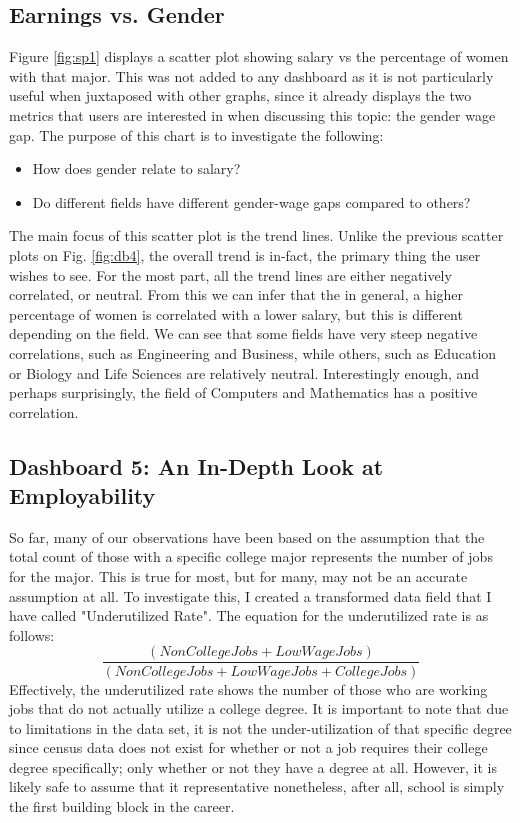 \documentclass[sigchi]{acmart}
\begin{document}
\subsection{Earnings vs. Gender}
\label{sec:earningsgender}

Figure \ref{fig:sp1} displays a scatter plot showing salary vs the percentage of women with that major. This was not added to any dashboard as it is not particularly useful when juxtaposed with other graphs, since it already displays the two metrics that users are interested in when discussing this topic: the gender wage gap. The purpose of this chart is to investigate the following:
\begin{itemize}
\item{How does gender relate to salary?}
\item{Do different fields have different gender-wage gaps compared to others?}
\end{itemize}
The main focus of this scatter plot is the trend lines. Unlike the previous scatter plots on Fig. \ref{fig:db4}, the overall trend is in-fact, the primary thing the user wishes to see. For the most part, all the trend lines are either negatively correlated, or neutral. From this we can infer that the in general, a higher percentage of women is correlated with a lower salary, but this is different depending on the field. We can see that some fields have very steep negative correlations, such as Engineering and Business, while others, such as Education or Biology and Life Sciences are relatively neutral. Interestingly enough, and perhaps surprisingly, the field of Computers and Mathematics has a positive correlation.


\subsection{Dashboard 5: An In-Depth Look at Employability}
\label{sec:db5}

So far, many of our observations have been based on the assumption that the total count of those with a specific college major represents the number of jobs for the major. This is true for most, but for many, may not be an accurate assumption at all. To investigate this, I created a transformed data field that I have called "Underutilized Rate". The equation for the underutilized rate is as follows:
\begin{displaymath}
  \frac{(NonCollegeJobs + LowWageJobs)}{(NonCollegeJobs + LowWageJobs + CollegeJobs)}
\end{displaymath}
Effectively, the underutilized rate shows the number of those who are working jobs that do not actually utilize a college degree. It is important to note that due to limitations in the data set, it is not the under-utilization of that specific degree since census data does not exist for whether or not a job requires their college degree specifically; only whether or not they have a degree at all. However, it is likely safe to assume that it representative nonetheless, after all, school is simply the first building block in the career.
\end{document}

